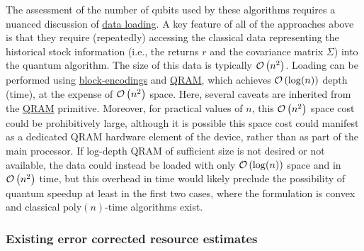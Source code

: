 \begin{refsection}
The assessment of the number of qubits used by these algorithms requires a nuanced discussion of \hyperref[prim:LoadingClassicalData]{data loading}. A key feature of all of the approaches above is that they require (repeatedly) accessing the classical data representing the historical stock information (i.e., the returns $
r$ and the covariance matrix $\Sigma$) into the quantum algorithm. The size of this data is typically $\mathcal{O}\left( n^2 \right)$.
Loading can be performed using \hyperref[prim:BlockEncodings]{block-encodings} and \hyperref[prim:QRAM]{QRAM}, which achieves $\mathcal{O}\left( \log(n) \right)$ depth (time), at the expense of $\mathcal{O}\left( n^2 \right)$ space. Here, several caveats are inherited from the \hyperref[prim:QRAM]{QRAM} primitive. Moreover, for practical values of $n$, this $\mathcal{O}\left( n^2 \right)$ space cost could be prohibitively large, although it is possible this space cost could manifest as a dedicated QRAM hardware element of the device, rather than as part of the main processor. If log-depth QRAM of sufficient size is not desired or not available, the data could instead be loaded with only $\mathcal{O}\left( \log(n) \right)$ space and in $\mathcal{O}\left( n^2 \right)$ time, but this overhead in time would likely preclude the possibility of quantum speedup at least in the first two cases, where the formulation is convex and classical $\mathrm{poly}(n)$-time algorithms exist. 


\subsubsection*{Existing error corrected resource estimates}


\end{refsection}
